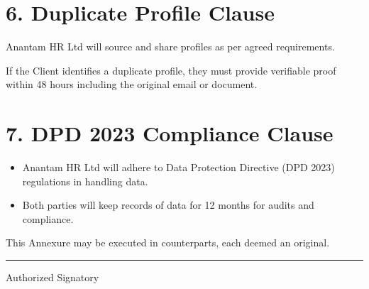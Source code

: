 \documentclass{article}
\begin{document}
\section*{6. Duplicate Profile Clause}

Anantam HR Ltd will source and share profiles as per agreed requirements.

If the Client identifies a duplicate profile, they must provide verifiable proof within 48 hours including the original email or document.

\section*{7. DPD 2023 Compliance Clause}

\begin{itemize}
\item Anantam HR Ltd will adhere to Data Protection Directive (DPD 2023) regulations in handling data.
\item Both parties will keep records of data for 12 months for audits and compliance.
\end{itemize}

\bigskip
This Annexure may be executed in counterparts, each deemed an original.

\bigskip
\vspace{2cm}

\noindent\rule{6cm}{0.4pt}  
Authorized Signatory
\end{document}
